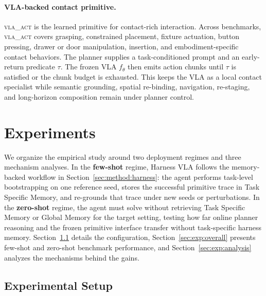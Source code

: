 \documentclass[11pt]{article}
\begin{document}
\paragraph{VLA-backed contact primitive.}
\textsc{vla\_act} is the learned primitive for contact-rich interaction. Across benchmarks, \textsc{vla\_act} covers grasping, constrained placement, fixture actuation, button pressing, drawer or door manipulation, insertion, and embodiment-specific contact behaviors. The planner supplies a task-conditioned prompt and an early-return predicate $\tau$. The frozen VLA $f_\theta$ then emits action chunks until $\tau$ is satisfied or the chunk budget is exhausted. This keeps the VLA as a local contact specialist while semantic grounding, spatial re-binding, navigation, re-staging, and long-horizon composition remain under planner control.

\section{Experiments}
\label{sec:result}

We organize the empirical study around two deployment regimes and three mechanism analyses. In the \textbf{few-shot} regime, Harness VLA follows the memory-backed workflow in Section~\ref{sec:method:harness}: the agent performs task-level bootstrapping on one reference seed, stores the successful primitive trace in Task Specific Memory, and re-grounds that trace under new seeds or perturbations. In the \textbf{zero-shot} regime, the agent must solve without retrieving Task Specific Memory or Global Memory for the target setting, testing how far online planner reasoning and the frozen primitive interface transfer without task-specific harness memory. Section~\ref{sec:exp:setup} details the configuration, Section~\ref{sec:exp:overall} presents few-shot and zero-shot benchmark performance, and Section~\ref{sec:exp:analysis} analyzes the mechanisms behind the gains.

\subsection{Experimental Setup}
\label{sec:exp:setup}
\end{document}
